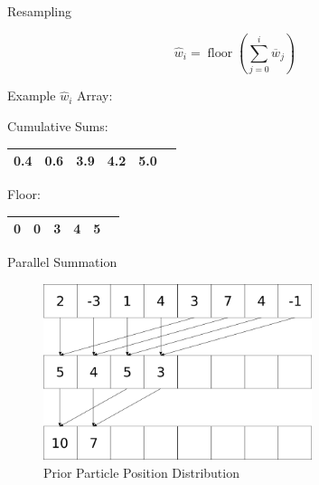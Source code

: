 \documentclass{beamer}
\begin{document}

\begin{frame}{Resampling}

\begin{equation}\label{resample3}
\hat{w}_{i}=\operatorname{floor}(\sum_{j=0}^{i} \overline{w}_{j})
\end{equation}

\vspace{0.5cm}

\begin{center}
Example \(\hat{w}_{i}\) Array:
\end{center}

\renewcommand{\tabcolsep}{0.5cm}

\begin{center}
Cumulative Sums:
\end{center}
\begin{center}
\begin{tabular}{ | c | c | c | c | c | c | }
  \hline
   0.4 & 0.6 & 3.9 & 4.2 & 5.0 \\
  \hline
\end{tabular}
\end{center}

\renewcommand{\tabcolsep}{0.65cm}

\begin{center}
Floor:
\end{center}
\begin{center}
\begin{tabular}{ | c | c | c | c | c | c | }
  \hline
   0 & 0 & 3 & 4 & 5 \\
  \hline
\end{tabular}
\end{center}

\end{frame}


\begin{frame}[containsverbatim]{Parallel Summation}

\begin{figure}
\centering
\includegraphics[width=0.7\textwidth]{data/summation.png}
\caption{Prior Particle Position Distribution}
\end{figure}

\end{frame}
\end{document}
